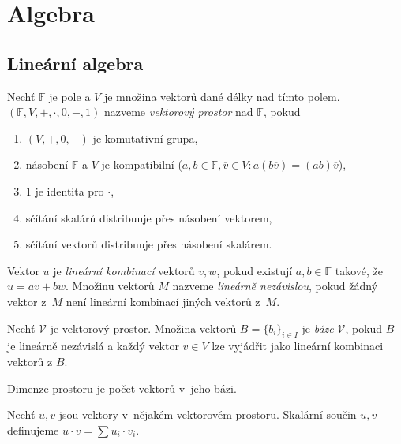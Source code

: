 \section{Algebra}

\subsection{Lineární algebra}

\begin{definition}
    Nechť $\mathbb{F}$ je pole
    a $V$ je množina vektorů dané délky nad tímto polem.
    $(\mathbb{F}, V, +, \cdot, 0, -, 1)$ nazveme {\em vektorový prostor}
    nad $\mathbb{F}$,
    pokud
    \begin{enumerate}
        \item $(V, +, 0, -)$ je komutativní grupa,
        \item násobení $\mathbb{F}$ a $V$ je kompatibilní
        ($a, b \in \mathbb{F}, \overline{v} \in V : a(b\overline{v}) = (ab)\overline{v}$),
        \item $1$ je identita pro $\cdot$,
        \item sčítání skalárů distribuuje přes násobení vektorem,
        \item sčítání vektorů distribuuje přes násobení skalárem.
    \end{enumerate}
\end{definition}

Vektor $u$ je {\em lineární kombinací} vektorů $v, w$, pokud existují
$a,b \in \mathbb{F}$ takové, že $u = av + bw$.
Množinu vektorů $M$ nazveme {\em lineárně nezávislou}, pokud žádný
vektor z~$M$ není lineární kombinací jiných vektorů z~$M$.

\begin{definition}
    Nechť $\mathcal{V}$ je vektorový prostor.
    Množina vektorů $B = \{ b_i \}_{i \in I}$ je {\em báze} $\mathcal{V}$,
    pokud $B$ je lineárně nezávislá
    a každý vektor $v \in V$ lze vyjádřit jako lineární kombinaci
    vektorů z $B$.
\end{definition}

\begin{definition}[Dimenze]
    Dimenze prostoru je počet vektorů v~jeho bázi.
\end{definition}

\begin{definition}
    Nechť $u, v$ jsou vektory v~nějakém vektorovém prostoru.
    Skalární součin $u, v$ definujeme
    $u \cdot v = \sum u_i \cdot v_i$.
\end{definition}

